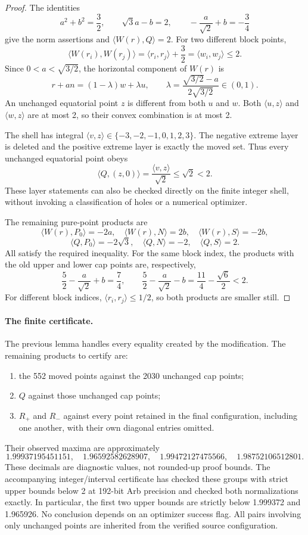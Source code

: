 \documentclass[11pt]{article}
\newcommand{\ip}[2]{\langle #1,#2\rangle}
\begin{document}
\begin{proof}
The identities
\[
a^2+b^2=\frac32,\qquad \sqrt3a-b=2,\qquad
-\frac a{\sqrt2}+b=-\frac34
\]
give the norm assertions and $\ip{W(r)}Q=2$.
For two different block points,
\[
\ip{W(r_i)}{W(r_j)}=\ip{r_i}{r_j}+\frac32=\ip{w_i}{w_j}\le2.
\]
Since $0<a<\sqrt{3/2}$, the horizontal component of $W(r)$ is
\[
r+a n=(1-\lambda)w+\lambda u,\qquad
\lambda=\frac{\sqrt{3/2}-a}{2\sqrt{3/2}}\in(0,1).
\]
An unchanged equatorial point $z$ is different from both $u$ and $w$.
Both $\ip uz$ and $\ip wz$ are at most 2, so their convex combination is
at most 2.

The shell has integral $\ip vz\in\{-3,-2,-1,0,1,2,3\}$.
The negative extreme layer is deleted and the positive extreme layer
is exactly the moved set. Thus every unchanged equatorial point obeys
\[
 \ip Q{(z,0)}=\frac{\ip vz}{\sqrt2}\le\sqrt2<2.
\]
These layer statements can also be checked directly on the finite integer
shell, without invoking a classification of holes or a numerical optimizer.

The remaining pure-point products are
\[
\ip{W(r)}{P_0}=-2a,\quad
\ip{W(r)}N=2b,\quad \ip{W(r)}S=-2b,
\]
\[
\ip Q{P_0}=-2\sqrt3,\quad \ip QN=-2,\quad \ip QS=2.
\]
All satisfy the required inequality. For the same block index, the
products with the old upper and lower cap points are, respectively,
\[
\frac52-\frac a{\sqrt2}+b=\frac74,
\qquad
\frac52-\frac a{\sqrt2}-b=\frac{11}{4}-\frac{\sqrt6}{2}<2.
\]
For different block indices, $\ip{r_i}{r_j}\le1/2$, so both products
are smaller still.
\end{proof}

\paragraph{The finite certificate.}
The previous lemma handles every equality created by the modification.
The remaining products to certify are:
\begin{enumerate}
\item the 552 moved points against the 2030 unchanged cap points;
\item $Q$ against those unchanged cap points;
\item $R_+$ and $R_-$ against every point retained in the final configuration,
      including one another, with their own diagonal entries omitted.
\end{enumerate}
Their observed maxima are approximately
\[
1.99937195451151,\quad 1.96592582628907,\quad
1.99472127475566,\quad 1.98752106512801.
\]
These decimals are diagnostic values, not rounded-up proof bounds.
The accompanying integer/interval certificate has checked these groups with
strict upper bounds below 2 at 192-bit Arb precision and checked both
normalizations exactly. In particular, the first two upper bounds are
strictly below 1.999372 and 1.965926.
No conclusion depends on an optimizer success flag. All pairs involving
only unchanged points are inherited from the verified source configuration.
\end{document}
